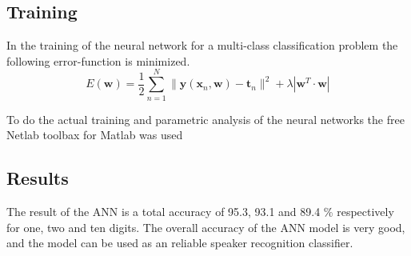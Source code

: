 \subsection*{Training}
In the training of the neural network for a multi-class classification problem the following error-function is minimized.
\begin{equation}
E(\mathbf{w}) = \dfrac{1}{2} \sum_{n=1}^{N}\| \mathbf{y}(\mathbf{x}_n,\mathbf{w})-\mathbf{t}_n \|^2+\lambda| \mathbf{w}^T \cdot \mathbf{w}|
\label{eq:ANN_error_rap}
\end{equation}

To do the actual training and parametric analysis of the neural networks the free Netlab toolbax for Matlab was used \cite{Netlab}

\subsection*{Results}
The result of the ANN is a total accuracy of 95.3, 93.1 and 89.4 \% respectively for one, two and ten digits. 
The overall accuracy of the ANN model is very good, and the model can be used as an reliable speaker recognition classifier.  
